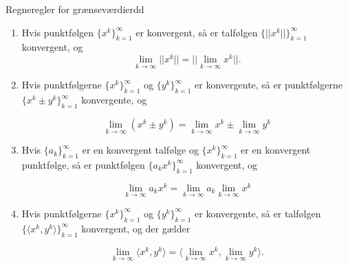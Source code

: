 \begin{mytheo}{Regneregler for grænseværdier}{dd}

\begin{enumerate}[label=(\alph*)]
    \item Hvis punktfølgen $\{x^k\}^\infty_{k=1}$ er konvergent, så er talfølgen $\{||x^k||\}^\infty_{k=1}$ konvergent, og 
    \begin{equation}
        \lim_{k \to \infty} ||x^k|| = || \lim_{k \to \infty} x^k||.
    \end{equation}
    
    \item Hvis punktfølgerne $\{x^k\}^\infty_{k=1}$ og $\{y^k\}^\infty_{k=1}$ er konvergente, så er punktfølgerne \\
    $\{x^k \pm y^k\}^\infty_{k=1}$ konvergente, og 
    
    \begin{equation}
        \lim_{k \to \infty} (x^k \pm y^k) =  \lim_{k \to \infty} x^k \pm \lim_{k \to \infty} y^k
    \end{equation}
    
    \item Hvis $\{a_k\}^\infty_{k=1}$ er en konvergent talfølge og $\{x^k\}^\infty_{k=1}$ er en konvergent punktfølge, så er punktfølgen $\{a_kx^k\}^\infty_{k=1}$ konvergent, og 
    
    \begin{equation}
        \lim_{k \to \infty} a_k x^k =  \lim_{k \to \infty} a_k \lim_{k \to \infty} x^k
    \end{equation}
    
    \item Hvis punktfølgerne $\{x^k\}^\infty_{k=1}$ og $\{y^k\}^\infty_{k=1}$ er konvergente, så er talfølgen $\{\langle x^k,y^k\rangle\}^\infty_{k=1}$ konvergent, og der gælder 
    
    \begin{equation}
         \lim_{k \to \infty} \langle x^k,y^k\rangle =   \langle \lim_{k \to \infty} x^k, \lim_{k \to \infty} y^k \rangle.
    \end{equation}
    
\end{enumerate}

\end{mytheo}